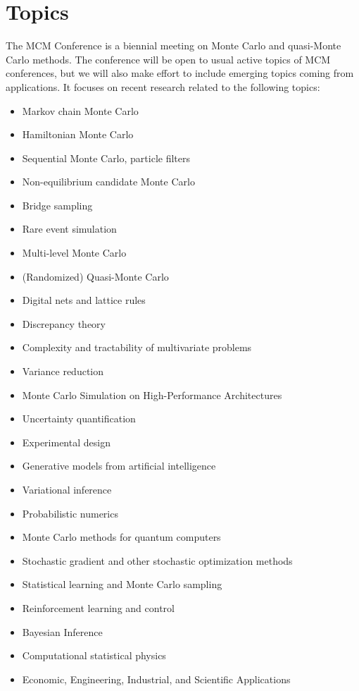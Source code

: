 \documentclass{article}
\begin{document}
\section{Topics}
The MCM Conference is a biennial meeting on Monte Carlo and quasi-Monte Carlo methods.
The conference will be open to usual active topics of MCM conferences, but we will
also make effort to include emerging topics coming from applications.  It focuses on recent research related to the following topics:
\begin{itemize}
\item Markov chain Monte Carlo
\item Hamiltonian Monte Carlo
\item Sequential Monte Carlo, particle filters
\item Non-equilibrium candidate Monte Carlo
\item Bridge sampling
\item Rare event simulation
\item Multi-level Monte Carlo
\item (Randomized) Quasi-Monte Carlo
\item Digital nets and lattice rules
\item Discrepancy theory
\item Complexity and tractability of multivariate problems
\item Variance reduction
\item Monte Carlo Simulation on High-Performance Architectures
\item Uncertainty quantification
\item Experimental design
\item Generative models from artificial intelligence
\item Variational inference
\item Probabilistic numerics
\item Monte Carlo methods for quantum computers
\item Stochastic gradient and other stochastic optimization methods
\item Statistical learning and Monte Carlo sampling
\item Reinforcement learning and control
\item Bayesian Inference
\item Computational statistical physics
\item Economic, Engineering, Industrial, and Scientific Applications
\end{itemize}
\end{document}
